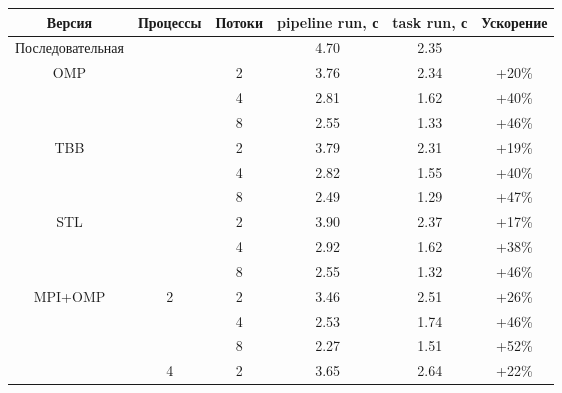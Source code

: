 \documentclass[12pt]{article}
\begin{document}
\begin{table}[H]
\centering
\begin{tabular}{|c|c|c|c|c|c|}
\hline
\textbf{Версия}   & \textbf{Процессы} & \textbf{Потоки} & \textbf{pipeline run, с} & \textbf{task run, с} & \textbf{Ускорение} \\
\hline
\multirow{1}{*}{Последовательная}  &              &                  & 4.70                  & 2.35               & \\
\hline
\multirow{3}{*}{OMP}               &              & 2                & 3.76                  & 2.34               & +20\% \\
                                   &              & 4                & 2.81                  & 1.62               & +40\% \\
                                   &              & 8                & 2.55                  & 1.33               & +46\% \\
\hline
\multirow{3}{*}{TBB}               &              & 2                & 3.79                  & 2.31               & +19\% \\
                                   &              & 4                & 2.82                  & 1.55               & +40\% \\
                                   &              & 8                & 2.49                  & 1.29               & +47\% \\
\hline
\multirow{3}{*}{STL}               &              & 2                & 3.90                  & 2.37               & +17\% \\
                                   &              & 4                & 2.92                  & 1.62               & +38\% \\
                                   &              & 8                & 2.55                  & 1.32               & +46\% \\
\hline
\multirow{9}{*}{MPI+OMP}    & \multirow{3}{*}{2}  & 2                & 3.46                  & 2.51               & +26\% \\
                            &                     & 4                & 2.53                  & 1.74               & +46\% \\
                            &                     & 8                & 2.27                  & 1.51               & +52\% \\
\cline{2-6}
                            & \multirow{3}{*}{4}  & 2                & 3.65                  & 2.64               & +22\% \\

\end{tabular}
\end{table}
\end{document}
